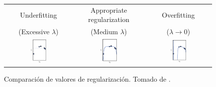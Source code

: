 \begin{figure}[H]
  \centering
  \begin{tabular}{ccc}
    Underfitting          & Appropriate regularization & Overfitting \\
    (Excessive $\lambda$) & (Medium $\lambda$)         & ($\lambda \to 0$) \\
    \includegraphics[width=0.25\textwidth]{Figures/regularization-comparison0.pdf} & %
    \includegraphics[width=0.25\textwidth]{Figures/regularization-comparison1.pdf} & %
    \includegraphics[width=0.25\textwidth]{Figures/regularization-comparison2.pdf} \\
  \end{tabular}
  \decoRule
  \caption[Comparación de valores de regularización]{Comparación de valores de regularización. Tomado de \cite{deeplearning}.}
  \label{fig:regularization-comparison}
\end{figure}


